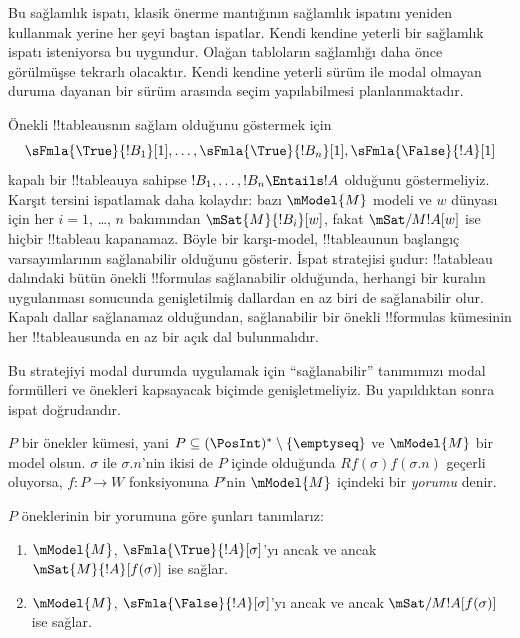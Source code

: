 \documentclass[../../../include/open-logic-section]{subfiles}
\begin{document}


\begin{editorial}
  Bu sağlamlık ispatı, klasik önerme mantığının sağlamlık ispatını yeniden
  kullanmak yerine her şeyi baştan ispatlar. Kendi kendine yeterli bir sağlamlık
  ispatı isteniyorsa bu uygundur. Olağan tabloların sağlamlığı daha önce
  görülmüşse tekrarlı olacaktır. Kendi kendine yeterli sürüm ile modal olmayan
  duruma dayanan bir sürüm arasında seçim yapılabilmesi planlanmaktadır.
\end{editorial}

\begin{explain}
  Önekli !!{tableau}s{}nın sağlam olduğunu göstermek için
  \[
  \sFmla{\True}{!B_1}[1], \dots, \sFmla{\True}{!B_n}[1], \sFmla{\False}{!A}[1]
  \]
  kapalı bir !!{tableau}{}ya sahipse $!B_1, \dots, !B_n \Entails !A$ olduğunu
  göstermeliyiz. Karşıt tersini ispatlamak daha kolaydır: bazı $\mModel{M}$
  modeli ve $w$ dünyası için her $i=1$, \dots, $n$ bakımından
  $\mSat{M}{!B_i}[w]$, fakat $\mSat/{M}{!A}[w]$ ise hiçbir !!{tableau}
  kapanamaz. Böyle bir karşı-model, !!{tableau}{}nun başlangıç varsayımlarının
  sağlanabilir olduğunu gösterir. İspat stratejisi şudur: !!a{tableau} dalındaki
  bütün önekli !!{formula}s sağlanabilir olduğunda, herhangi bir kuralın
  uygulanması sonucunda genişletilmiş dallardan en az biri de sağlanabilir
  olur. Kapalı dallar sağlanamaz olduğundan, sağlanabilir bir önekli
  !!{formula}s kümesinin her !!{tableau}{}sunda en az bir açık dal bulunmalıdır.

  Bu stratejiyi modal durumda uygulamak için ``sağlanabilir'' tanımımızı modal
  formülleri ve önekleri kapsayacak biçimde genişletmeliyiz. Bu yapıldıktan
  sonra ispat doğrudandır.
\end{explain}

\begin{defn}
  $P$ bir önekler kümesi, yani $P \subseteq (\PosInt)^*
  \setminus \{\emptyseq\}$ ve $\mModel{M}$ bir model olsun. $\sigma$ ile
  $\sigma.n$'nin ikisi de $P$ içinde olduğunda $Rf(\sigma)f(\sigma.n)$
  geçerli oluyorsa, $f\colon P \to W$ fonksiyonuna $P$'nin $\mModel{M}$
  içindeki bir \emph{yorumu} denir.

  $P$ öneklerinin bir yorumuna göre şunları tanımlarız:
  \begin{enumerate}
  \item $\mModel{M}$, $\sFmla{\True}{!A}[\sigma]$'yı ancak ve ancak
    $\mSat{M}{!A}[f(\sigma)]$ ise sağlar.
  \item $\mModel{M}$, $\sFmla{\False}{!A}[\sigma]$'yı ancak ve ancak
    $\mSat/{M}{!A}[f(\sigma)]$ ise sağlar.
  \end{enumerate}
\end{defn}
\end{document}
